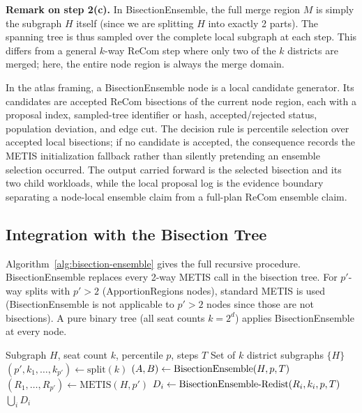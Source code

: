 \noindent\textbf{Remark on step 2(c).} In BisectionEnsemble, the full merge
region $M$ is simply the subgraph $H$ itself (since we are splitting $H$ into
exactly 2 parts). The spanning tree is thus sampled over the complete local
subgraph at each step. This differs from a general $k$-way ReCom step where
only two of the $k$ districts are merged; here, the entire node region is
always the merge domain.

In the atlas framing, a BisectionEnsemble node is a local candidate generator.
Its candidates are accepted ReCom bisections of the current node region, each
with a proposal index, sampled-tree identifier or hash, accepted/rejected
status, population deviation, and edge cut.
The decision rule is percentile selection over accepted local bisections; if no
candidate is accepted, the consequence records the METIS initialization
fallback rather than silently pretending an ensemble selection occurred.
The output carried forward is the selected bisection and its two child
workloads, while the local proposal log is the evidence boundary separating a
node-local ensemble claim from a full-plan ReCom ensemble claim.

\subsection{Integration with the Bisection Tree}
\label{sec:alg:tree}

Algorithm~\ref{alg:bisection-ensemble} gives the full recursive procedure.
BisectionEnsemble replaces every 2-way METIS call in the bisection tree.
For $p'$-way splits with $p' > 2$ (ApportionRegions nodes), standard METIS
is used (BisectionEnsemble is not applicable to $p' > 2$ nodes since those
are not bisections). A pure binary tree (all seat counts $k = 2^d$) applies
BisectionEnsemble at every node.

\begin{algorithm}[h]
\caption{BisectionEnsemble redistricting}
\label{alg:bisection-ensemble}
\begin{algorithmic}[1]
\Require Subgraph $H$, seat count $k$, percentile $p$, steps $T$
\Ensure Set of $k$ district subgraphs
  \Return $\{H\}$
\EndIf
\State $(p', k_1, \ldots, k_{p'}) \leftarrow \text{split}(k)$ 
 
  \State $(A, B) \leftarrow \textup{BisectionEnsemble}(H, p, T)$
\Else {}
  \State $(R_1, \ldots, R_{p'}) \leftarrow \text{METIS}(H, p')$
\EndIf
{}
  \State $D_i \leftarrow \textup{BisectionEnsemble-Redist}(R_i, k_i, p, T)$
\EndFor
\Return $\bigcup_i D_i$
\end{algorithmic}
\end{algorithm}

